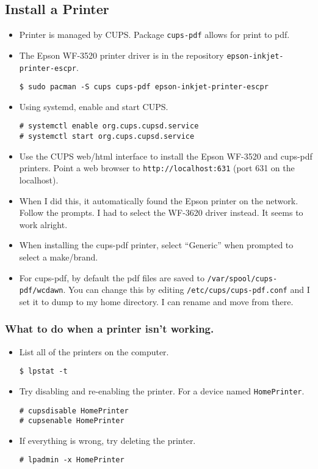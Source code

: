 \documentclass{article}
\begin{document}
  \subsection{Install a Printer}
    \begin{itemize}
      \item Printer is managed by CUPS. Package \verb|cups-pdf| allows for print
        to pdf.
      \item The Epson WF-3520 printer driver is in the repository
        \verb|epson-inkjet-printer-escpr|.
\begin{verbatim}
$ sudo pacman -S cups cups-pdf epson-inkjet-printer-escpr
\end{verbatim}
      \item Using systemd, enable and start CUPS.
\begin{verbatim}
# systemctl enable org.cups.cupsd.service
# systemctl start org.cups.cupsd.service
\end{verbatim}
      \item Use the CUPS web/html interface to install the Epson WF-3520 and
        cups-pdf printers. Point a web browser to \verb|http://localhost:631|
        (port 631 on the localhost).
      \item When I did this, it automatically found the Epson printer on the
        network. Follow the prompts. I had to select the WF-3620 driver instead.
        It seems to work alright.
      \item When installing the cups-pdf printer, select ``Generic'' when
        prompted to select a make/brand.
      \item For cups-pdf, by default the pdf files are saved to
        \verb|/var/spool/cups-pdf/wcdawn|. You can change this by editing
        \verb|/etc/cups/cups-pdf.conf| and I set it to dump to my home
        directory. I can rename and move from there.
    \end{itemize}

    \subsubsection{What to do when a printer isn't working.}
      \begin{itemize}
        \item List all of the printers on the computer.
\begin{verbatim}
$ lpstat -t
\end{verbatim}
        \item Try disabling and re-enabling the printer. For a device named
          \verb|HomePrinter|.
\begin{verbatim}
# cupsdisable HomePrinter
# cupsenable HomePrinter
\end{verbatim}
        \item If everything is wrong, try deleting the printer.
\begin{verbatim}
# lpadmin -x HomePrinter
\end{verbatim}
      \end{itemize}
\end{document}
